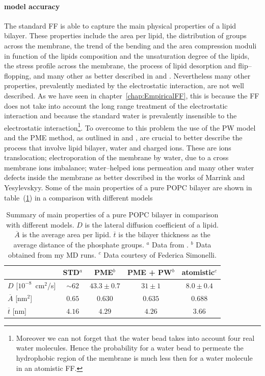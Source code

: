 \paragraph{\textbf{model accuracy}} The standard \martini \ac{FF} is able to capture the main physical properties 
of a lipid bilayer. These properties include the area per lipid, the distribution of groups across the membrane, 
the trend of the bending and the area compression moduli in function of the lipids composition and the 
unsaturation degree of the lipids, the stress profile across the membrane, the process of lipid desorption and 
flip--flopping, and many other as better described in \cite{Martini} and \cite{MartiniReview}. Nevertheless many 
other properties, prevalently mediated by the electrostatic interaction, are not well described. As we have seen 
in chapter~\ref{chap:EmpiricalFF}, this is because the \martini \ac{FF} does not take into account the long range 
treatment of the electrostatic interaction and because the standard \martini water is prevalently insensible to 
the electrostatic interaction\footnote{Moreover we can not forget that the \martini water bead takes into account 
four real water molecules. Hence the probability for a \martini water bead to permeate the hydrophobic region of 
the membrane is much less then for a water molecule in an atomistic \ac{FF}.}. To overcome to this problem the 
use of the \ac{PW} model and the \ac{PME} method, as outlined in \cite{MartiniReview} and \cite{PW}, are crucial 
to better describe the process that involve lipid bilayer, water and charged ions. These are ions translocation; 
electroporation of the membrane by water, due to a cross membrane ions imbalance; water--helped ions permeation 
and many other water defects inside the membrane as better described in the works of Marrink and Yesylevskyy. 
Some of the main properties of a pure \ac{POPC} bilayer are shown in table~(\ref{tab:POPCData}) in a comparison 
with different models
\begin{table}[h!t]
	\centering
	\begin{tabular}{lcccc}
		\toprule
		\,				& STD$^a$	& \acs{PME}$^b$	& \acs{PME} + \acs{PW}$^b$	& atomistic$^c$ \\ \toprule
		$D$	[$10^{-8}$~cm$^2$/s]	& $\sim62$	& $43.3 \pm 0.7$ & $31 \pm 1$	& $8.0 \pm 0.4$	\\ \midrule
		$\overline{A}$ [nm$^2$]		& $0.65$	& $0.630$		 & $0.635$		& $0.688$		\\ \midrule
		$\overline{t}$ [nm]			& $4.16$	& $4.29$		 & $4.26$ 		& $3.66$		\\ \bottomrule
	\end{tabular}
	\caption{Summary of main properties of a pure \acs{POPC} bilayer in comparison with different models. $D$ is the lateral diffusion coefficient of a lipid. $\overline{A}$ is the average area per lipid. $\overline{t}$ is the bilayer thickness as the average distance of the phosphate groups. \footnotesize $^a$ Data from \cite{Rossi2014}. $^b$ Data obtained from my \ac{MD} runs. $^c$ Data courtesy of Federica Simonelli.}
	\label{tab:POPCData}
\end{table}

